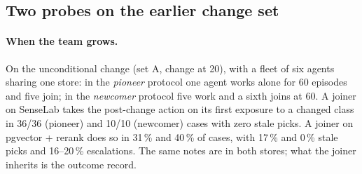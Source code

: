 \documentclass[11pt]{article}
\begin{document}
\subsection{Two probes on the earlier change set}

\paragraph{When the team grows.} On the unconditional change (set A, change at 20), with a
fleet of six agents sharing one store: in the \emph{pioneer} protocol one agent works alone for
60 episodes and five join; in the \emph{newcomer} protocol five work and a sixth joins at 60. A
joiner on SenseLab takes the post-change action on its first exposure to a changed class in 36/36
(pioneer) and 10/10 (newcomer) cases with zero stale picks. A joiner on pgvector + rerank does so
in 31\,\% and 40\,\% of cases, with 17\,\% and 0\,\% stale picks and 16--20\,\% escalations. The
same notes are in both stores; what the joiner inherits is the outcome record.

\begin{table}[H]
\centering\scriptsize\setlength{\tabcolsep}{3pt}
\caption{When the team grows (set A, change at 20, fleet of six sharing one store; \emph{pioneer}: one agent works alone to episode 60, five join). First-attempt success of the joiners on their first exposure to each class after joining, with the veterans' rate before they joined; \emph{stale-pick}: the joiner applied the pre-change action.}
\label{tab:teamgrows}
\end{table}
\end{document}
